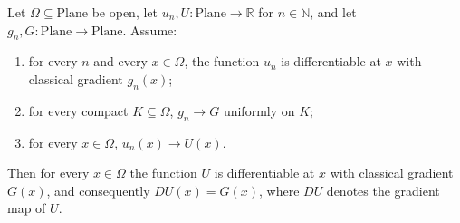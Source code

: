 \begin{lemma}
Let $\Omega\subseteq\mathrm{Plane}$ be open, let $u_n,U\colon\mathrm{Plane}\to\mathbb{R}$ for
$n\in\mathbb{N}$, and let $g_n,G\colon\mathrm{Plane}\to\mathrm{Plane}$.  Assume:
\begin{enumerate}
\item for every $n$ and every $x\in\Omega$, the function $u_n$ is differentiable at $x$ with
classical gradient $g_n(x)$;
\item for every compact $K\subseteq\Omega$, $g_n\to G$ uniformly on $K$;
\item for every $x\in\Omega$, $u_n(x)\to U(x)$.
\end{enumerate}
Then for every $x\in\Omega$ the function $U$ is differentiable at $x$ with classical gradient
$G(x)$, and consequently $DU(x)=G(x)$, where $DU$ denotes the gradient map of $U$.
\end{lemma}
